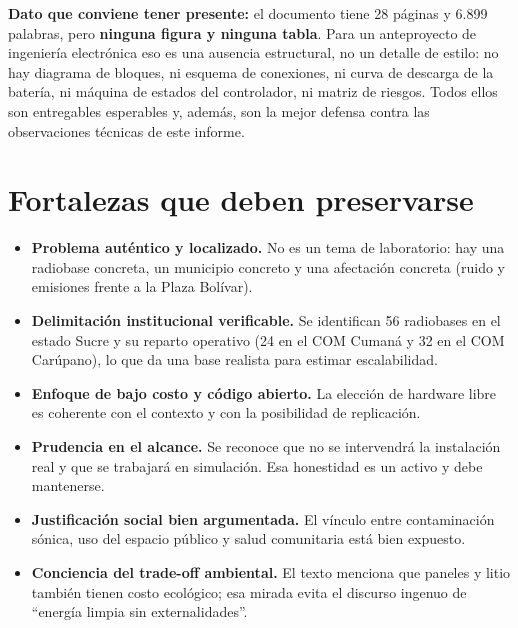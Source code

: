 \documentclass[11pt,a4paper]{article}
\begin{document}
\begin{tcolorbox}[cajaMejora]
\textbf{Dato que conviene tener presente:} el documento tiene 28 páginas y 6.899 palabras, pero \textbf{ninguna figura y ninguna tabla}. Para un anteproyecto de ingeniería electrónica eso es una ausencia estructural, no un detalle de estilo: no hay diagrama de bloques, ni esquema de conexiones, ni curva de descarga de la batería, ni máquina de estados del controlador, ni matriz de riesgos. Todos ellos son entregables esperables y, además, son la mejor defensa contra las observaciones técnicas de este informe.
\end{tcolorbox}

\section{Fortalezas que deben preservarse}

\begin{tcolorbox}[cajaFortaleza, colbacktitle=verdeSignal!70!black, coltitle=white, title={Lo que está bien y no debería perderse en la corrección}]
\begin{itemize}[leftmargin=1.2em, itemsep=2pt]
  \item \textbf{Problema auténtico y localizado.} No es un tema de laboratorio: hay una radiobase concreta, un municipio concreto y una afectación concreta (ruido y emisiones frente a la Plaza Bolívar).
  \item \textbf{Delimitación institucional verificable.} Se identifican 56 radiobases en el estado Sucre y su reparto operativo (24 en el COM Cumaná y 32 en el COM Carúpano), lo que da una base realista para estimar escalabilidad.
  \item \textbf{Enfoque de bajo costo y código abierto.} La elección de hardware libre es coherente con el contexto y con la posibilidad de replicación.
  \item \textbf{Prudencia en el alcance.} Se reconoce que no se intervendrá la instalación real y que se trabajará en simulación. Esa honestidad es un activo y debe mantenerse.
  \item \textbf{Justificación social bien argumentada.} El vínculo entre contaminación sónica, uso del espacio público y salud comunitaria está bien expuesto.
  \item \textbf{Conciencia del trade-off ambiental.} El texto menciona que paneles y litio también tienen costo ecológico; esa mirada evita el discurso ingenuo de ``energía limpia sin externalidades''.
\end{itemize}
\end{tcolorbox}
\end{document}
